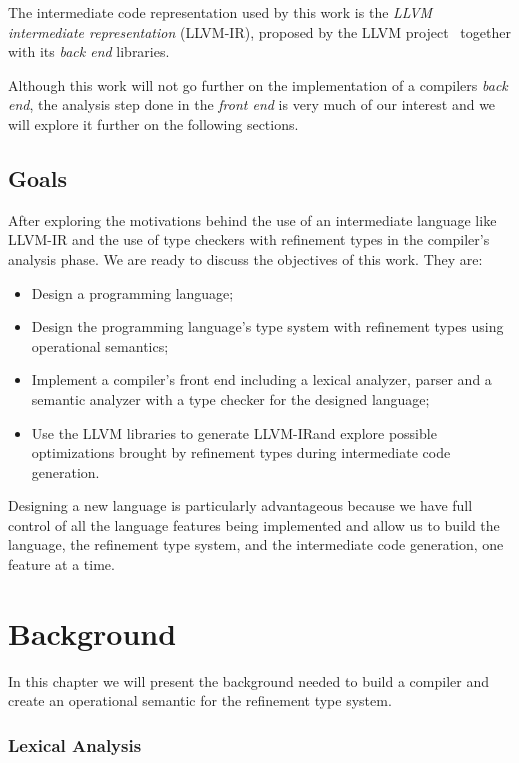 \documentclass[english, lmodern, oneside, nopageanchorhack]{ufsc-thesis-rn46-2019}
\begin{document}
The intermediate code representation used by this work is the \textit{LLVM intermediate representation} (LLVM-IR), proposed by the LLVM project~\cite{lattner2004llvm} together with its \textit{back end} libraries.

Although this work will not go further on the implementation of a compilers \textit{back end}, the analysis step done in the \textit{front end} is very much of our interest and we will explore it further on the following sections.

\section{Goals}\label{chapter:introduction:sec:goals}

After exploring the motivations behind the use of an intermediate language like LLVM-IR and the use of type checkers with refinement types in the compiler's analysis phase.
We are ready to discuss the objectives of this work.
They are:
\begin{itemize}
    \item Design a programming language;
    \item Design the programming language's type system with refinement types using operational semantics;
    \item Implement a compiler's front end including a lexical analyzer, parser and a semantic analyzer with a type checker for the designed language;
    \item Use the LLVM libraries to generate LLVM-IR\@ and explore possible optimizations brought by refinement types during intermediate code generation.
\end{itemize}

Designing a new language is particularly advantageous because we have full control of all the language features being implemented and allow us to build the language, the refinement type system, and the intermediate code generation, one feature at a time.

\chapter{Background}\label{chapter:background}

In this chapter we will present the background needed to build a compiler and create an operational semantic for the refinement type system.

\subsection{Lexical Analysis}
\end{document}
